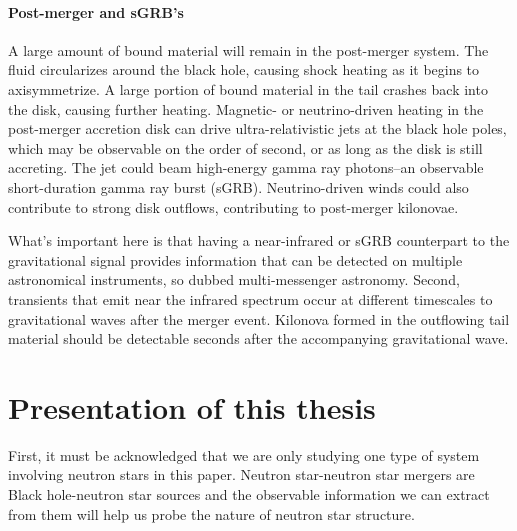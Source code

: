 \paragraph{Post-merger and sGRB's}
A large amount of bound material will remain in the post-merger system.  
The fluid circularizes around the black hole, causing shock heating as it begins to axisymmetrize. 
A large portion of bound material in the tail crashes back into the disk, causing further heating.
Magnetic- or neutrino-driven heating in the post-merger accretion disk can drive ultra-relativistic jets at the black hole poles, which may be observable on the order of second, or as long as the disk is still accreting.
The jet could beam high-energy gamma ray photons--an observable short-duration gamma ray burst (sGRB).
Neutrino-driven winds could also contribute to strong disk outflows, contributing to post-merger kilonovae.

What's important here is that having a near-infrared or sGRB counterpart to the gravitational signal provides information that can be detected on multiple astronomical instruments, so dubbed multi-messenger astronomy.
Second, transients that emit near the infrared spectrum occur at different timescales to gravitational waves after the merger event.
Kilonova formed in the outflowing tail material should be detectable seconds after the accompanying gravitational wave.  


\section{Presentation of this thesis}

First, it must be acknowledged that we are only studying one type of system involving neutron stars in this paper.  Neutron star-neutron star mergers are 
Black hole-neutron star sources and the observable information we can extract from them will help us probe the nature of neutron star structure.

